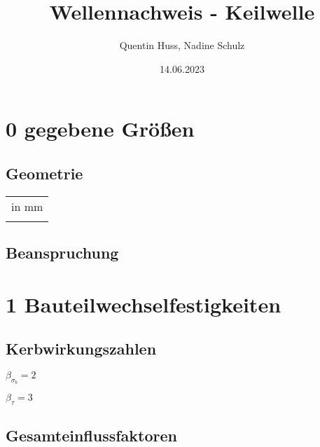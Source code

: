 \documentclass[
]{article}
\title{Wellennachweis - Keilwelle}
\author{Quentin Huss, Nadine Schulz}
\date{14.06.2023}
\begin{document}
\maketitle

\hypertarget{gegebene-gruxf6uxdfen}{%
\section{0 gegebene Größen}\label{gegebene-gruxf6uxdfen}}

\hypertarget{geometrie}{%
\subsection{Geometrie}\label{geometrie}}

\begin{table}[!h]
\centering
\begin{tabular}[t]{lr}
\toprule
\multicolumn{2}{c}{in mm} \\
\cmidrule(l{3pt}r{3pt}){1-2}
\cellcolor{gray!6}{Wellendurchmesser} & \cellcolor{gray!6}{50}\\
\bottomrule
\end{tabular}
\end{table}

\hypertarget{beanspruchung}{%
\subsection{Beanspruchung}\label{beanspruchung}}

\hypertarget{bauteilwechselfestigkeiten}{%
\section{1
Bauteilwechselfestigkeiten}\label{bauteilwechselfestigkeiten}}

\hypertarget{kerbwirkungszahlen}{%
\subsection{Kerbwirkungszahlen}\label{kerbwirkungszahlen}}

\begin{center}
$\beta_{\sigma_b} = 2$ 
  
$\beta_{\tau} = 3$  
\end{center}

\hypertarget{gesamteinflussfaktoren}{%
\subsection{Gesamteinflussfaktoren}\label{gesamteinflussfaktoren}}
\end{document}
